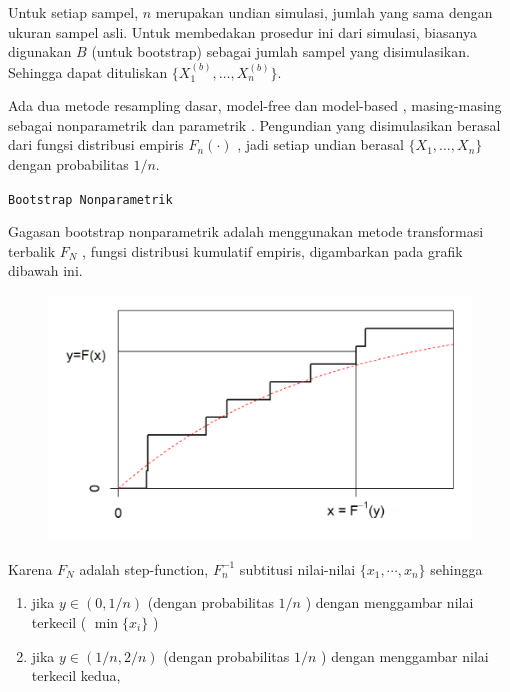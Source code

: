\documentclass[
]{book}
\begin{document}
Untuk setiap sampel, \(n\) merupakan undian simulasi, jumlah yang sama dengan ukuran sampel asli. Untuk membedakan prosedur ini dari simulasi, biasanya digunakan \(B\) (untuk bootstrap) sebagai jumlah sampel yang disimulasikan. Sehingga dapat dituliskan \(\{X_1^{(b)}, \ldots, X_n^{(b)}\}\).

Ada dua metode resampling dasar, model-free dan model-based , masing-masing sebagai nonparametrik dan parametrik . Pengundian yang disimulasikan berasal dari fungsi distribusi empiris \(F_n(\cdot)\) , jadi setiap undian berasal \(\{X_1, \ldots, X_n\}\) dengan probabilitas \(1/n\).

\texttt{Bootstrap\ Nonparametrik}

Gagasan bootstrap nonparametrik adalah menggunakan metode transformasi terbalik \(F_N\) , fungsi distribusi kumulatif empiris, digambarkan pada grafik dibawah ini.

\begin{figure}

{\centering \includegraphics[width=1\linewidth]{images/6.2.1-1} 

}

\end{figure}

Karena \(F_N\) adalah step-function, \(F_n^{-1}\) subtitusi nilai-nilai \(\{x_1,\cdots,x_n\}\) sehingga

\begin{enumerate}
\def\labelenumi{\arabic{enumi}.}
\item
  jika \(y\in(0,1/n)\) (dengan probabilitas \(1 / n\) ) dengan menggambar nilai terkecil ( \(\min\{x_i\}\) )
\item
  jika \(y\in(1/n,2/n)\) (dengan probabilitas \(1 / n\) ) dengan menggambar nilai terkecil kedua,
\end{enumerate}
\end{document}
